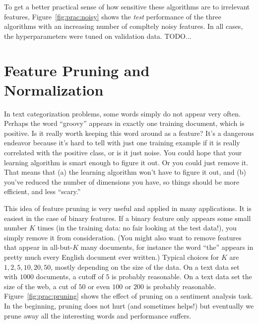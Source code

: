 
To get a better practical sense of how sensitive these algorithms are
to irrelevant features, Figure~\ref{fig:prac:noisy} shows the
\emph{test} performance of the three algorithms with an increasing
number of compltely noisy features.  In all cases, the hyperparameters
were tuned on validation data.  TODO...

\section{Feature Pruning and Normalization}

In text categorization problems, some words simply do not appear very
often.  Perhaps the word ``groovy''
appears in exactly one training document, which is positive.  Is it
really worth keeping this word around as a feature?  It's a dangerous
endeavor because it's hard to tell with just one training example if
it is really correlated with the positive class, or is it just noise.
You could hope that your learning algorithm is smart enough to figure
it out.  Or you could just remove it.  That means that (a) the
learning algorithm won't have to figure it out, and (b) you've reduced
the number of dimensions you have, so things should be more efficient,
and less ``scary.''


This idea of feature pruning is very useful and applied in many
applications.  It is easiest in the case of binary features.  If a
binary feature only appears some small number $K$ times (in the
training data: no fair looking at the test data!), you simply remove
it from consideration.  (You might also want to remove features that
appear in all-but-$K$ many documents, for instance the word ``the''
appears in pretty much every English document ever written.)  Typical
choices for $K$ are $1, 2, 5, 10, 20, 50$, mostly depending on the
size of the data.  On a text data set with $1000$ documents, a cutoff
of $5$ is probably reasonable.  On a text data set the size of the
web, a cut of $50$ or even $100$ or $200$ is probably
reasonable.
Figure~\ref{fig:prac:pruning} shows the effect of pruning on a
sentiment analysis task.  In the beginning, pruning does not hurt (and
sometimes helps!) but eventually we prune away all the interesting
words and performance suffers.

